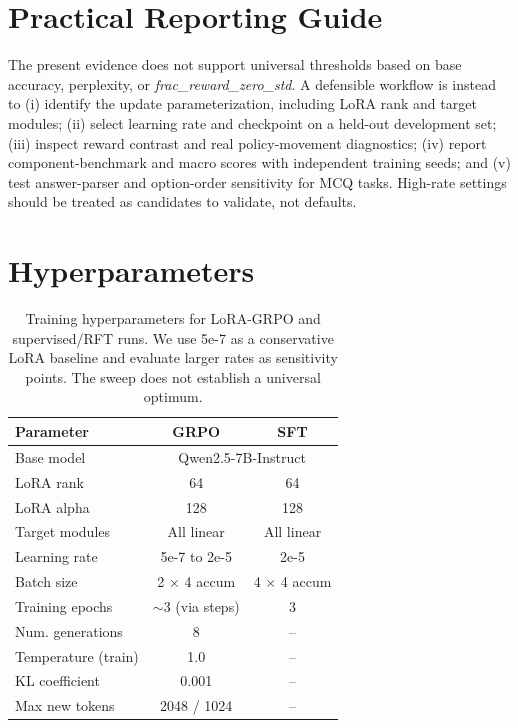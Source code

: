 \documentclass[11pt]{article}
\begin{document}


\appendix

\section{Practical Reporting Guide}
\label{sec:recipe_guide}

The present evidence does not support universal thresholds based on base accuracy, perplexity, or \textit{frac\_reward\_zero\_std}. A defensible workflow is instead to (i) identify the update parameterization, including LoRA rank and target modules; (ii) select learning rate and checkpoint on a held-out development set; (iii) inspect reward contrast and real policy-movement diagnostics; (iv) report component-benchmark and macro scores with independent training seeds; and (v) test answer-parser and option-order sensitivity for MCQ tasks. High-rate settings should be treated as candidates to validate, not defaults.

\section{Hyperparameters}
\label{sec:hyperparams}

\begin{table}[h]
\centering
\small
\begin{tabular}{lcc}
\toprule
\textbf{Parameter} & \textbf{GRPO} & \textbf{SFT} \\
\midrule
Base model & \multicolumn{2}{c}{Qwen2.5-7B-Instruct} \\
LoRA rank & 64 & 64 \\
LoRA alpha & 128 & 128 \\
Target modules & All linear & All linear \\
Learning rate & 5e-7 to 2e-5 & 2e-5 \\
Batch size & 2 $\times$ 4 accum & 4 $\times$ 4 accum \\
Training epochs & $\sim$3 (via steps) & 3 \\
Num. generations & 8 & -- \\
Temperature (train) & 1.0 & -- \\
KL coefficient & 0.001 & -- \\
Max new tokens & 2048 / 1024 & -- \\
\bottomrule
\end{tabular}
\caption{Training hyperparameters for LoRA-GRPO and supervised/RFT runs. We use 5e-7 as a conservative LoRA baseline and evaluate larger rates as sensitivity points. The sweep does not establish a universal optimum.}
\label{tab:hyperparams}
\end{table}
\end{document}
